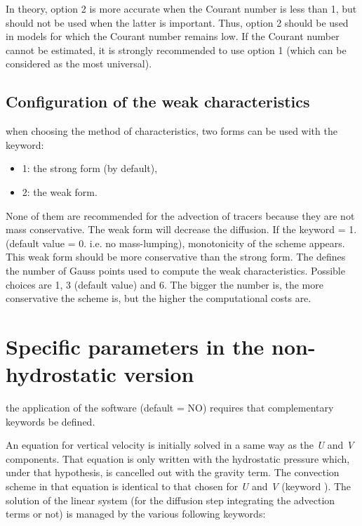 In theory, option 2 is more accurate when the Courant number is less than 1,
but should not be used when the latter is important. Thus, option 2 should be
used in models for which the Courant number remains low. If the Courant number
cannot be estimated, it is strongly recommended to use option 1 (which can be
considered as the most universal).

\subsection{Configuration of the weak characteristics}

when choosing the method of characteristics, two forms can be used with the
keyword:

\begin{itemize}
\item 1: the strong form (by default),

\item 2: the weak form.
\end{itemize}

None of them are recommended for the advection of tracers because they are not
mass conservative. The weak form will decrease the diffusion. If the keyword
 = 1. (default value = 0. i.e. no
mass-lumping), monotonicity of the scheme appears. This weak form should be
more conservative than the strong form. The  defines the number of Gauss points used to compute the
weak characteristics. Possible choices are 1, 3 (default value) and 6. The
bigger the number is, the more conservative the scheme is, but the higher the
computational costs are.


\section{Specific parameters in the non-hydrostatic version}

the application of the software  (default = NO)
requires that complementary keywords be defined.

An equation for vertical velocity is initially solved in a same way as the
\textit{U} and \textit{V} components. That equation is only written with the
hydrostatic pressure which, under that hypothesis, is cancelled out with the
gravity term. The convection scheme in that equation is identical to that
chosen for \textit{U} and \textit{V} (keyword ). The solution of the linear system (for the diffusion step
integrating the advection terms or not) is managed by the various following
keywords:

